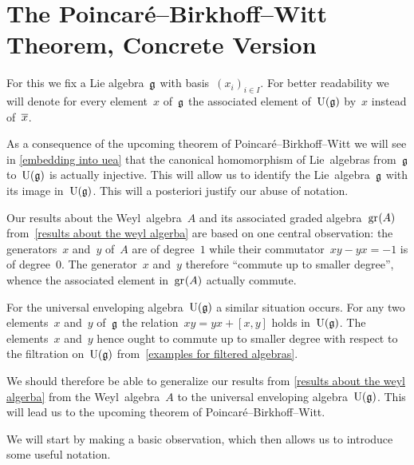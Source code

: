 \section{The Poincaré--Birkhoff--Witt Theorem, Concrete Version}
\label{section for concrete pbw}


\begin{convention}
	For this  we fix a Lie algebra~$\mathfrak{g}$ with basis~$(x_i)_{i \in I}$.
	For better readability we will denote for every element~$x$ of~$\mathfrak{g}$ the associated element of~$\operatorname{U}(\mathfrak{g})$ by~$x$ instead of~$\overline{x}$.
\end{convention}


\begin{remark}
	As a consequence of the upcoming theorem of Poincaré--Birkhoff--Witt we will see in \cref{embedding into uea} that the canonical homomorphism of Lie~algebras from~$\mathfrak{g}$ to~$\operatorname{U}(\mathfrak{g})$ is actually injective.
	This will allow us to identify the Lie~algebra~$\mathfrak{g}$ with its image in~$\operatorname{U}(\mathfrak{g})$.
	This will a posteriori justify our abuse of notation.
\end{remark}


\begin{fluff}
	Our results about the Weyl~algebra~$A$ and its associated graded algebra~$\gr(A)$ from~\cref{results about the weyl algerba} are based on one central observation:
	the generators~$x$ and~$y$ of~$A$ are of degree~$1$ while their commutator~$xy - yx = -1$ is of degree~$0$.
	The generator~$x$ and~$y$ therefore \enquote{commute up to smaller degree}, whence the associated element in~$\gr(A)$ actually commute.
	
	For the universal enveloping algebra~$\operatorname{U}(\mathfrak{g})$ a similar situation occurs.
	For any two elements~$x$ and~$y$ of~$\mathfrak{g}$ the relation~$xy = yx + [x,y]$ holds in~$\operatorname{U}(\mathfrak{g})$.
	The elements~$x$ and~$y$ hence ought to commute up to smaller degree with respect to the filtration on~$\operatorname{U}(\mathfrak{g})$ from~\cref{examples for filtered algebras}.

	We should therefore be able to generalize our results from \cref{results about the weyl algerba} from the Weyl~algebra~$A$ to the universal enveloping algebra~$\operatorname{U}(\mathfrak{g})$.
	This will lead us to the upcoming theorem of Poincaré--Birkhoff--Witt.

	We will start by making a basic observation, which then allows us to introduce some useful notation.
\end{fluff}


